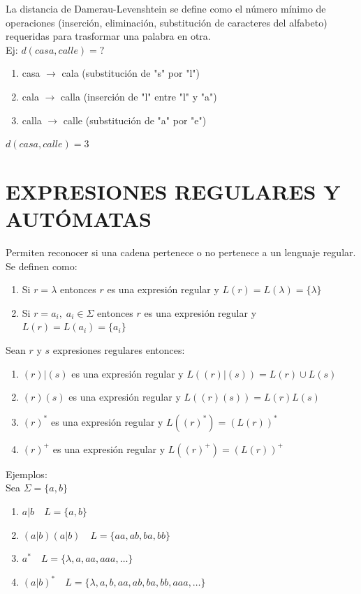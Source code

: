 La distancia de Damerau-Levenshtein se define como el número mínimo de operaciones (inserción, eliminación, substitución de caracteres del alfabeto) requeridas para trasformar una palabra en otra.\\
Ej: $d(casa, calle) = ?$
\begin{enumerate}
    \item casa $\rightarrow$ cala (substitución de "s" por "l")
    \item cala $\rightarrow$ calla (inserción de "l" entre "l" y "a")
    \item calla $\rightarrow$ calle (substitución de "a" por "e")
\end{enumerate}

$d(casa, calle) = 3$

\section{EXPRESIONES REGULARES Y AUTÓMATAS}
Permiten reconocer si una cadena pertenece o no pertenece a un lenguaje regular.\\
Se definen como:


\begin{enumerate}
    \item Si $r=\lambda$ entonces $r$ es una expresión regular y $L(r)= L(\lambda)=\{\lambda\}$
    \item Si $r=a_i,\; a_i\in\Sigma$ entonces $r$ es una expresión regular y $L(r)=L(a_i)= \{a_i\}$
\end{enumerate}
Sean $r$ y $s$ expresiones regulares entonces:

\begin{enumerate}
    \item $(r)|(s)$ es una expresión regular y $L((r)|(s))=L(r)\cup L(s)$
    \item $(r)(s)$ es una expresión regular y $L((r)(s))=L(r) L(s)$
    \item $(r)^*$ es una expresión regular y $L((r)^*)=(L(r))^*$
    \item $(r)^+$ es una expresión regular y $L((r)^+)=(L(r))^+$
\end{enumerate}

Ejemplos:\\
Sea $\Sigma =\{a, b\}$

\begin{enumerate}
    \item  $a|b \quad L=\{a, b\}$
    \item  $(a|b)(a|b) \quad L=\{aa, ab, ba, bb\}$
    \item  $a^* \quad L=\{\lambda, a, aa, aaa, \dots\}$
    \item  $(a|b)^* \quad L=\{\lambda, a, b, aa, ab, ba, bb, aaa, \dots\}$
\end{enumerate}

